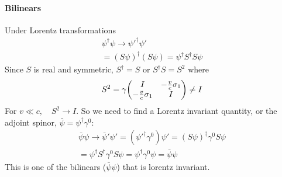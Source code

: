 \documentclass[../main.tex]{subfiles}
\begin{document}
\paragraph*{Bilinears}
Under Lorentz transformations
\begin{align*}
    \psi^\dagger \psi \to \psi'^\dagger \psi' \\
    = (S\psi)^\dagger (S\psi) = \psi^\dagger S^\dagger S \psi
\end{align*}
Since $S$ is real and symmetric, $S^\dagger = S$ or $S^\dagger S = S^2$ where
\begin{align*}
    S^2 = \gamma \mqty(I & -\frac{v}{c} \sigma_1 \\ -\frac{v}{c} \sigma_1 & I) \neq I
\end{align*}
For $v \ll c, \quad S^2 \to I$. So we need to find a Lorentz invariant quantity, or the adjoint 
spinor, $\bar\psi = \psi^\dagger \gamma^0$:
\begin{align*}
    \bar\psi \psi \to \bar\psi' \psi' = (\psi'^\dagger \gamma^0) \psi' 
    = (S\psi)^\dagger \gamma^0 S \psi \\
    = \psi^\dagger S^\dagger \gamma^0 S \psi = \psi^\dagger \gamma^0 \psi = \bar \psi \psi
\end{align*}
This is one of the bilinears ($\bar \psi \psi$) that is lorentz invariant.
\end{document}
